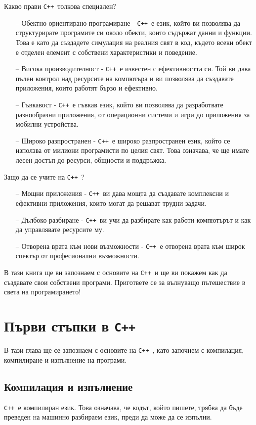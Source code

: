 \documentclass[oneside]{book}
\newcommand*{\cpp}{\texttt{C++}\ }
\begin{document}
Какво прави \cpp толкова специален?
\begin{itemize}
    \item[--] Обектно-ориентирано програмиране - \cpp е език, който ви позволява да структурирате програмите си около обекти, които съдържат данни и функции. Това е като да създадете симулация на реалния свят в код, където всеки обект е отделен елемент с собствени характеристики и поведение.
    \item[--] Висока производителност - \cpp е известен с ефективността си. Той ви дава пълен контрол над ресурсите на компютъра и ви позволява да създавате приложения, които работят бързо и ефективно. 
    \item[--] Гъвкавост - \cpp е гъвкав език, който ви позволява да разработвате разнообразни приложения, от операционни системи и игри до приложения за мобилни устройства. 
    \item[--] Широко разпространен - \cpp е широко разпространен език, който се използва от милиони програмисти по целия свят. Това означава, че ще имате лесен достъп до ресурси, общности и поддръжка.
\end{itemize}

Защо да се учите на \cpp?
\begin{itemize}
    \item[--] Мощни приложения - \cpp ви дава мощта да създавате комплексни и ефективни приложения, които могат да решават трудни задачи. 
    \item[--] Дълбоко разбиране - \cpp ви учи да разбирате как работи компютърът и как да управлявате ресурсите му. 
    \item[--] Отворена врата към нови възможности - \cpp е отворена врата към широк спектър от професионални възможности. 
\end{itemize}

В тази книга ще ви запознаем с основите на \cpp и ще ви покажем как да създавате свои собствени програми. Пригответе се за вълнуващо пътешествие в света на програмирането! 

\section{Първи стъпки в \cpp}
В тази глава ще се запознаем с основите на \cpp, като започнем с компилация, компилиране и изпълнение на програми.

\subsection{Компилация и изпълнение}
\cpp е компилиран език. Това означава, че кодът, който пишете, трябва да бъде преведен на машинно разбираем език, преди да може да се изпълни.
\end{document}
